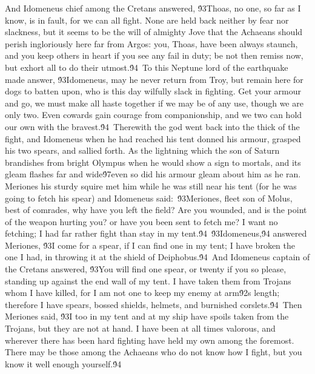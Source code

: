 {And Idomeneus chief among the Cretans answered, \'93Thoas, no one, so far as I know, is in fault, for we can all fight. None are held back neither by fear nor slackness, but it seems to be the will of almighty Jove that the Achaeans should perish ingloriously here far from Argos: you, Thoas, have been always staunch, and you keep others in heart if you see any fail in duty; be not then remiss now, but exhort all to do their utmost.\'94\
To this Neptune lord of the earthquake made answer, \'93Idomeneus, may he never return from Troy, but remain here for dogs to batten upon, who is this day wilfully slack in fighting. Get your armour and go, we must make all haste together if we may be of any use, though we are only two. Even cowards gain courage from companionship, and we two can hold our own with the bravest.\'94\
Therewith the god went back into the thick of the fight, and Idomeneus when he had reached his tent donned his armour, grasped his two spears, and sallied forth. As the lightning which the son of Saturn brandishes from bright Olympus when he would show a sign to mortals, and its gleam flashes far and wide\'97even so did his armour gleam about him as he ran. Meriones his sturdy squire met him while he was still near his tent (for he was going to fetch his spear) and Idomeneus said:\
\'93Meriones, fleet son of Molus, best of comrades, why have you left the field? Are you wounded, and is the point of the weapon hurting you? or have you been sent to fetch me? I want no fetching; I had far rather fight than stay in my tent.\'94\
\'93Idomeneus,\'94 answered Meriones, \'93I come for a spear, if I can find one in my tent; I have broken the one I had, in throwing it at the shield of Deiphobus.\'94\
And Idomeneus captain of the Cretans answered, \'93You will find one spear, or twenty if you so please, standing up against the end wall of my tent. I have taken them from Trojans whom I have killed, for I am not one to keep my enemy at arm\'92s length; therefore I have spears, bossed shields, helmets, and burnished corslets.\'94\
Then Meriones said, \'93I too in my tent and at my ship have spoils taken from the Trojans, but they are not at hand. I have been at all times valorous, and wherever there has been hard fighting have held my own among the foremost. There may be those among the Achaeans who do not know how I fight, but you know it well enough yourself.\'94\
}
